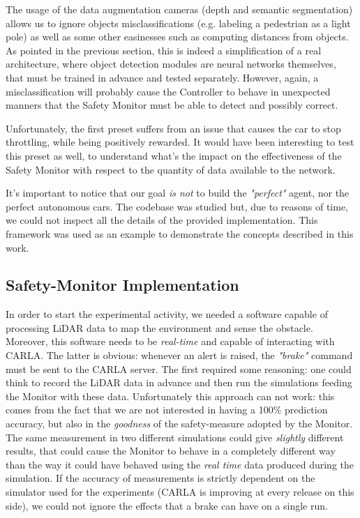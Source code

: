 The usage of the data augmentation cameras (depth and semantic segmentation) allows us to ignore objects misclassifications (e.g. labeling a pedestrian as a light pole) as well as some other easinesses such as computing distances from objects. As pointed in the previous section, this is indeed a simplification of a real architecture, where object detection modules are neural networks themselves, that must be trained in advance and tested separately. However, again, a misclassification will probably cause the Controller to behave in unexpected manners that the Safety Monitor must be able to detect and possibly correct.

Unfortunately, the first preset suffers from an issue that causes the car to stop throttling, while being positively rewarded\cite{coachIssue}. It would have been interesting to test this preset as well, to understand what's the impact on the effectiveness of the Safety Monitor with respect to the quantity of data available to the network.\newline

It's important to notice that our goal \textsl{is not} to build the \textsl{"perfect"} agent, nor the perfect autonomous cars. The codebase was studied but, due to reasons of time, we could not inspect all the details of the provided implementation. This framework was used as an example to demonstrate the concepts described in this work.


\subsection{Safety-Monitor Implementation}

In order to start the experimental activity, we needed a software capable of processing LiDAR data to map the environment and sense the obstacle. Moreover, this software needs to be \textsl{real-time} and capable of interacting with CARLA. The latter is obvious: whenever an alert is raised, the \textsl{"brake"} command must be sent to the CARLA server. The first required some reasoning: one could think to record the LiDAR data in advance and then run the simulations feeding the Monitor with these data. Unfortunately this approach can not work: this comes from the fact that we are not interested in having a 100\% prediction accuracy, but also in the \textsl{goodness} of the safety-measure adopted by the Monitor. The same measurement in two different simulations could give \textsl{slightly} different results, that could cause the Monitor to behave in a completely different way than the way it could have behaved using the \textsl{real time} data produced during the simulation. If the accuracy of measurements is strictly dependent on the simulator used for the experiments (CARLA is improving at every release on this side), we could not ignore the effects that a brake can have on a single run.

